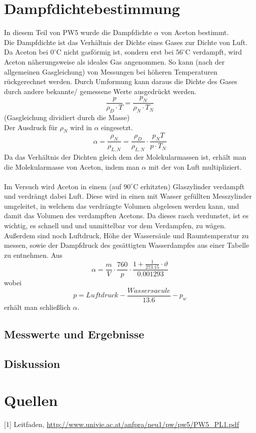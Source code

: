 \documentclass[12pt,a4paper]{article}
\begin{document}
\begin{multicols}{2}

\section{Dampfdichtebestimmung}
In diesem Teil von PW5 wurde die Dampfdichte $\alpha$ von Aceton bestimmt.\\
Die Dampfdichte ist das Verhältnis der Dichte eines Gases zur Dichte von Luft. Da Aceton bei $0 ^\circ$C nicht gasförmig ist, sondern erst bei $56^\circ$C verdampft, wird Aceton näherungsweise als ideales Gas angenommen. So kann (nach der allgemeinen Gasgleichung) von Messungen bei höheren Temperaturen rückgerechnet werden. Durch Umformung kann daraus die Dichte des Gases durch andere bekannte/ gemessene Werte ausgedrückt werden.
$$\frac{p}{\rho_D \cdot T}= \frac{p_N}{\rho_N \cdot T_N}$$ 
(Gasgleichung dividiert durch die Masse)\\
Der Ausdruck für $\rho_N$ wird in $\alpha$ eingesetzt.
$$\alpha = \frac{\rho_N}{\rho_{L,N}}=\frac{\rho_D}{\rho_{L,N}} \cdot \frac{p_N T}{p \cdot T_N}$$
Da das Verhältnis der Dichten gleich dem der Molekularmassen ist, erhält man die Molekularmasse von Aceton, indem man $\alpha$ mit der von Luft multipliziert.\\
\\
Im Versuch wird Aceton in einem (auf $90^\circ$C erhitzten) Glaszylinder verdampft und verdrängt dabei Luft. Diese wird in einen mit Wasser gefüllten Messzylinder umgeleitet, in welchem das verdrängte Volumen abgelesen werden kann, und damit das Volumen des verdampften Acetons.
Da dieses rasch verdunstet, ist es wichtig, es schnell und und unmittelbar vor dem Verdampfen, zu wägen.\\
Außerdem sind noch Luftdruck, Höhe der Wassersäule und Raumtemperatur zu messen, sowie der Dampfdruck des gesättigten Wasserdampfes aus einer Tabelle zu entnehmen. Aus
$$\alpha = \frac{m}{V} \cdot \frac{760}{p} \cdot \frac{1 + \frac{1}{273.15} \cdot \vartheta}{0.001293}$$
wobei
$$p= Luftdruck - \frac{Wassersaeule}{13.6} - p_w$$
erhält man schließlich $\alpha$.

\subsection{Messwerte und Ergebnisse}



\subsection{Diskussion}



\section{Quellen}
[1] Leitfaden, \url{http://www.univie.ac.at/anfpra/neu1/pw/pw5/PW5_PL1.pdf}\\

\end{multicols}
\end{document}
